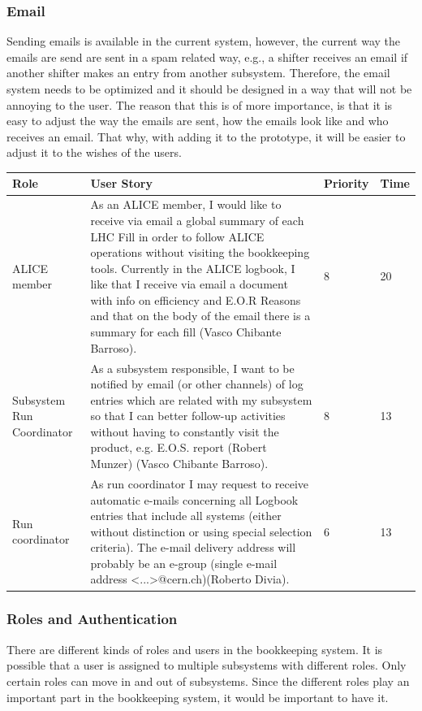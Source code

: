 \documentclass[paper=a4, fontsize=11pt,twoside]{scrartcl}	%
\begin{document}
\subsubsection{Email}
Sending emails is available in the current system, however, the current way the emails are send are sent in a spam related way, e.g., a shifter receives an email if another shifter makes an entry from another subsystem. Therefore, the email system needs to be optimized and it should be designed in a way that will not be annoying to the user. The reason that this is of more importance, is that it is easy to adjust the way the emails are sent, how the emails look like and who receives an email. That why, with adding it to the prototype, it will be easier to adjust it to the wishes of the users.
\begin{longtable}{ | p{3cm} | p{8cm} | p{1.5cm} | l |}
\hline
Role & User Story & Priority & Time \\ \hline
ALICE member & As an ALICE member, I would like to receive via email a global summary of each LHC Fill in order to follow ALICE operations without visiting the bookkeeping tools. Currently in the ALICE logbook, I like that I receive via email a document with info on efficiency and E.O.R Reasons and that on the body of the email there is a summary for
each fill (Vasco Chibante Barroso). & 8 & 20 \\ \hline
Subsystem Run Coordinator &  As a subsystem responsible, I want to be notified by email (or other
channels) of log entries which are related with my subsystem so that I can better follow-up activities without having to constantly visit the product, e.g. E.O.S. report (Robert Munzer) (Vasco Chibante Barroso). & 8 & 13 \\ \hline
Run coordinator & As run coordinator I may request to receive automatic e-mails concerning all Logbook entries that include all systems (either without distinction or using special selection criteria). The e-mail delivery address will probably be an e-group (single e-mail address <...>@cern.ch)(Roberto Divia). & 6 & 13 \\ \hline
\end{longtable}

\subsubsection{Roles and Authentication}
There are different kinds of roles and users in the bookkeeping system. It is possible that a user is assigned to multiple subsystems with different roles. Only certain roles can move in and out of subsystems. Since the different roles play an important part in the bookkeeping system, it  would be important to have it.
\end{document}
